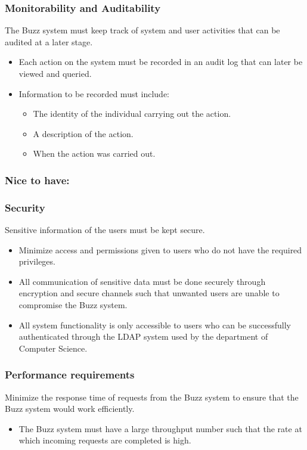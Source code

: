 \documentclass[12pt, oneside]{article}
\begin{document}
	\subsubsection*{Monitorability and Auditability}
	The Buzz system must keep track of system and user activities that can be audited at a later stage.
	\begin{itemize}
		\item Each action on the system must be recorded in an audit log that can later be viewed and queried.
		\item Information to be recorded must include:
		\begin{itemize}
			\item The identity of the individual carrying out the action.
			\item A description of the action.
			\item When the action was carried out.
		\end{itemize}						
	\end{itemize}
	\subsubsection{Nice to have:}
	
	\subsubsection*{Security}
	Sensitive information of the users must be kept secure. 
	\begin{itemize}
		\item Minimize access and permissions given to users who do not have the required privileges.
		\item All communication of sensitive data must be done securely through encryption and secure channels such that unwanted users are unable to compromise the Buzz system.
		\item All system functionality is only accessible to users who can be successfully authenticated through the LDAP system used by the department of Computer Science.
	\end{itemize}		
	
	\subsubsection*{Performance requirements}
	Minimize the response time of requests from the Buzz system to ensure that the Buzz system would work efficiently.
	\begin{itemize}
		\item The Buzz system must have a large throughput number such that the rate at which incoming requests are completed is high.
	\end{itemize}
					
\end{document}
